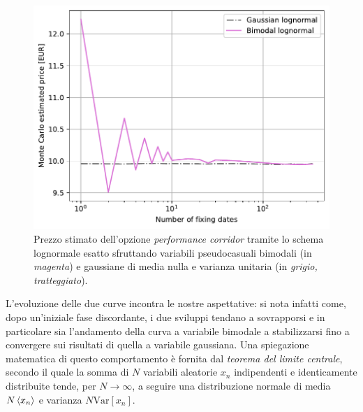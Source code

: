 \begin{figure}[t]
    \centering
    \includegraphics[scale=0.5]{graphs/OptionPriceBimodal_PriceVsM.pdf}
    \caption[Confronto tra il prezzo stimato dell'opzione \textit{performance corridor} sfruttando variabili  bimodali e gaussiane di media nulla e varianza unitaria.]{Prezzo stimato dell'opzione \textit{performance corridor} tramite lo schema lognormale esatto sfruttando variabili pseudocasuali bimodali (in \textit{magenta}) e gaussiane di media nulla e varianza unitaria (in \textit{grigio, tratteggiato}).}
    \label{fig:bimodal}
\end{figure}

L'evoluzione delle due curve incontra le nostre aspettative: si nota infatti come, dopo un'iniziale fase discordante, i due sviluppi tendano a sovrapporsi e in particolare sia l'andamento della curva a variabile bimodale a stabilizzarsi fino a convergere sui risultati di quella a variabile gaussiana.
Una spiegazione matematica di questo comportamento è fornita dal \textit{teorema del limite centrale}, secondo il quale la somma di $N$ variabili aleatorie $x_n$ indipendenti e identicamente distribuite tende, per $N \rightarrow \infty$, a seguire una distribuzione normale di media $N\braket{x_n}$ e varianza $N\text{Var}[x_n]$.

